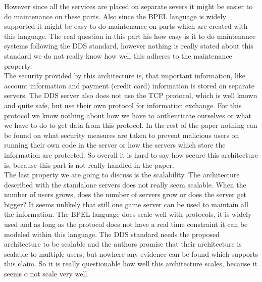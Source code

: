 \indent However since all the services are placed on separate severs it might be easier to do maintenance on these parts. Also since the BPEL language is widely supported it might be easy to do maintenance on parts which are created with this language. The real question in this part his how easy is it to do maintenance systems following the DDS standard, however nothing is really stated about this standard we do not really know how well this adheres to the maintenance property.\\
\indent The security provided by this architecture is, that important information, like account information and payment (credit card) information is stored on separate servers. The DDS server also does not use the TCP protocol, which is well known and quite safe, but use their own protocol for information exchange. For this protocol we know nothing about how we have to authenticate ourselves or what we have to do to get data from this protocol. In the rest of the paper nothing can be found on what security measures are taken to prevent malicious users on running their own code in the server or how the servers which store the information are protected. So overall it is hard to say how secure this architecture is, because this part is not really handled in the paper.\\
\indent The last property we are going to discuss is the scalability. The architecture described with the standalone servers does not really seem scalable. When the number of users grows, does the number of servers grow or does the server get bigger? It seems unlikely that still one game server can be used to maintain all the information. The BPEL language does scale well with protocols, it is widely used and as long as the protocol does not have a real time constraint it can be modeled within this language. The DDS standard needs the proposed architecture to be scalable and the authors promise that their architecture is scalable to multiple users, but nowhere any evidence can be found which supports this claim. So it is really questionable how well this architecture scales, because it seems o not scale very well.



